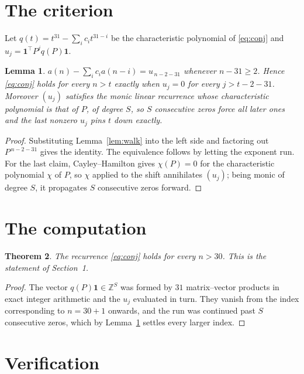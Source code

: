 \documentclass[11pt,a4paper]{article}
\theoremstyle{plain}
\newtheorem{theorem}{Theorem}
\newtheorem{lemma}[theorem]{Lemma}
\theoremstyle{definition}
\begin{document}
\section{The criterion}

Let $q(t)=t^{31}-\sum_i c_i t^{31-i}$ be the characteristic polynomial of
\eqref{eq:conj} and $u_j=\mathbf{1}^{\!\top}P^{j}q(P)\mathbf{1}$.

\begin{lemma}\label{lem:crit}
$a(n)-\sum_i c_i a(n-i)=u_{\,n-2-31}$ whenever $n-31\ge2$. Hence
\eqref{eq:conj} holds for every $n>t$ exactly when $u_j=0$ for every
$j>t-2-31$. Moreover $(u_j)$ satisfies the monic linear recurrence whose
characteristic polynomial is that of $P$, of degree $S$, so $S$ consecutive zeros force all
later ones and the last nonzero $u_j$ pins $t$ down exactly.
\end{lemma}

\begin{proof}
Substituting Lemma~\ref{lem:walk} into the left side and factoring out
$P^{\,n-2-31}$ gives the identity. The equivalence follows by letting the exponent
run. For the last claim, Cayley--Hamilton gives $\chi(P)=0$ for the characteristic
polynomial $\chi$ of $P$, so $\chi$ applied to the shift annihilates $(u_j)$; being monic of
degree $S$, it propagates $S$ consecutive zeros forward.
\end{proof}

\section{The computation}

\begin{theorem}
The recurrence \eqref{eq:conj} holds for every $n>30$. This is the statement of
Section~1.
\end{theorem}

\begin{proof}
The vector $q(P)\mathbf{1}\in\mathbb{Z}^{S}$ was formed by $31$ matrix--vector
products in exact integer arithmetic and the $u_j$ evaluated in turn. They vanish from the
index corresponding to $n=30+1$ onwards, and the run was continued past $S$ consecutive
zeros, which by Lemma~\ref{lem:crit} settles every larger index.
\end{proof}

\section{Verification}
\end{document}
